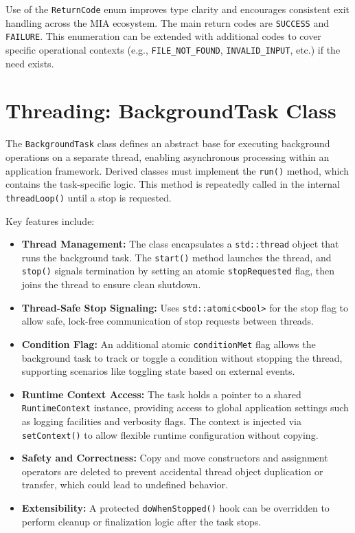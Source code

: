 Use of the \texttt{ReturnCode} enum improves type clarity and encourages consistent exit handling across the MIA ecosystem. The main return codes are \texttt{SUCCESS} and \texttt{FAILURE}. This enumeration can be extended with additional codes to cover specific operational contexts (e.g., \texttt{FILE\_NOT\_FOUND}, \texttt{INVALID\_INPUT}, etc.) if the need exists.













\section*{Threading: BackgroundTask Class}

The \texttt{BackgroundTask} class defines an abstract base for executing background operations on a separate thread, enabling asynchronous processing within an application framework. Derived classes must implement the \texttt{run()} method, which contains the task-specific logic. This method is repeatedly called in the internal \texttt{threadLoop()} until a stop is requested.

Key features include:

\begin{itemize}
	\item \textbf{Thread Management:} The class encapsulates a \texttt{std::thread} object that runs the background task. The \texttt{start()} method launches the thread, and \texttt{stop()} signals termination by setting an atomic \texttt{stopRequested} flag, then joins the thread to ensure clean shutdown.
	
	\item \textbf{Thread-Safe Stop Signaling:} Uses \texttt{std::atomic<bool>} for the stop flag to allow safe, lock-free communication of stop requests between threads.
	
	\item \textbf{Condition Flag:} An additional atomic \texttt{conditionMet} flag allows the background task to track or toggle a condition without stopping the thread, supporting scenarios like toggling state based on external events.
	
	\item \textbf{Runtime Context Access:} The task holds a pointer to a shared \texttt{RuntimeContext} instance, providing access to global application settings such as logging facilities and verbosity flags. The context is injected via \texttt{setContext()} to allow flexible runtime configuration without copying.
	
	\item \textbf{Safety and Correctness:} Copy and move constructors and assignment operators are deleted to prevent accidental thread object duplication or transfer, which could lead to undefined behavior.
	
	\item \textbf{Extensibility:} A protected \texttt{doWhenStopped()} hook can be overridden to perform cleanup or finalization logic after the task stops.
\end{itemize}

